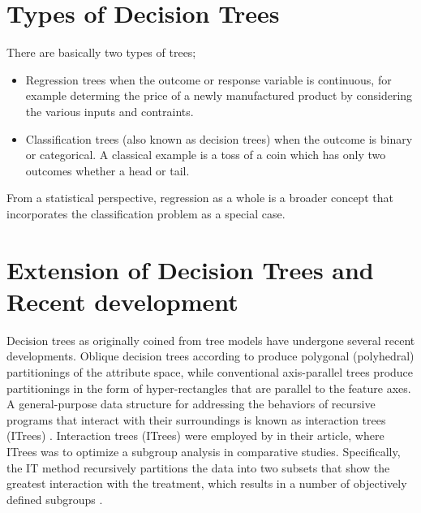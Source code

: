 \section{Types of Decision Trees}
There are basically two types of trees;
\begin{itemize}
	\item Regression trees when the outcome or response variable is continuous, for example determing the price of a newly manufactured product by considering the various inputs and contraints.

	\item Classification trees (also known as decision trees) when the outcome is binary or categorical. A classical example is a toss of a coin which has only two outcomes whether a head or tail.
\end{itemize}	
 From a statistical perspective, regression as a whole is a broader concept that incorporates the classification problem as a special case.


\section{Extension of Decision Trees  and Recent development}
Decision trees as originally coined from tree models have undergone several recent developments. Oblique decision trees according to \cite{murthy1995growing} produce polygonal (polyhedral) partitionings of the attribute space, while conventional axis-parallel trees produce partitionings in the form of hyper-rectangles that are parallel to the feature axes. A general-purpose data structure for addressing the behaviors of recursive programs that interact with their surroundings is known as interaction trees (ITrees) \citep{xia2019interaction}. Interaction trees (ITrees) were employed by  \cite{su2008interaction} in their article, where ITrees was to optimize a subgroup analysis in comparative studies. Specifically, the IT method recursively partitions the data into two subsets that show the greatest interaction with the treatment, which results in a number of objectively defined subgroups \citep{su2008interaction}.

